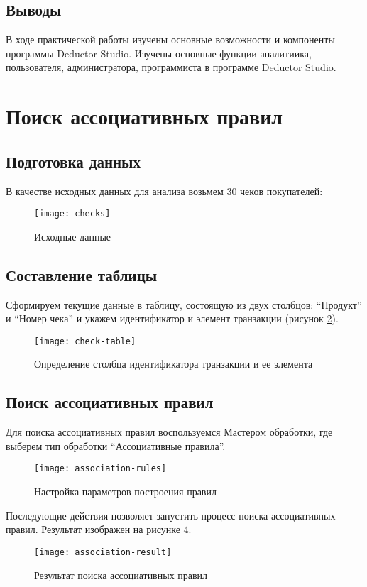 \documentclass[a4paper,14pt]{extarticle}
\begin{document}
\subsection{Выводы}
В ходе практической работы изучены основные возможности и компоненты программы
Deductor Studio. Изучены основные функции аналитиика, пользователя,
администратора, программиста в программе Deductor Studio.

\pagebreak
\section{Поиск ассоциативных правил}
\subsection{Подготовка данных}
В качестве исходных данных для анализа возьмем 30 чеков покупателей:
\begin{figure}[H]
    \centering
    \texttt{[image: checks]}
    \caption{Исходные данные}
    \label{fig:checks}
\end{figure}

\subsection{Составление таблицы}
Сформируем текущие данные в таблицу, состоящую из двух столбцов:
\enquote{Продукт} и \enquote{Номер чека} и укажем идентификатор и элемент
транзакции (рисунок \ref{fig:check-table}).
\begin{figure}[H]
    \centering
    \texttt{[image: check-table]}
    \caption{Определение столбца идентификатора транзакции и ее элемента}
    \label{fig:check-table}
\end{figure}

\subsection{Поиск ассоциативных правил}
Для поиска ассоциативных правил воспользуемся Мастером обработки, где выберем
тип обработки \enquote{Ассоциативные правила}.
\begin{figure}[H]
    \centering
    \texttt{[image: association-rules]}
    \caption{Настройка параметров построения правил}
    \label{fig:association-rules}
\end{figure}

Последующие действия позволяет запустить процесс поиска ассоциативных правил.
Результат изображен на рисунке \ref{fig:association-result}.
\begin{figure}[H]
    \centering
    \texttt{[image: association-result]}
    \caption{Результат поиска ассоциативных правил}
    \label{fig:association-result}
\end{figure}
\end{document}

